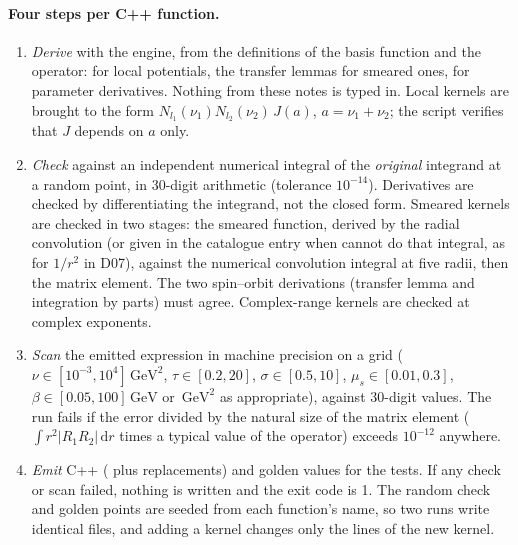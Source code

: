 \documentclass[11pt,a4paper]{article}
\numberwithin{equation}{section}
\theoremstyle{definition}
\theoremstyle{plain}
\theoremstyle{remark}
\numberwithin{algorithm}{section}
\newcommand{\dd}{\mathrm{d}}
\newcommand{\mus}{\mu_s}
\newcommand{\GeV}{\,\mathrm{GeV}}
\begin{document}
\paragraph{Four steps per C++ function.}
\begin{enumerate}[leftmargin=1.5em,itemsep=2pt]
\item \emph{Derive} with the engine, from the definitions of the basis function and the operator:  for local potentials, the transfer lemmas for smeared ones,  for parameter derivatives. Nothing from these notes is typed in. Local kernels are brought to the form $N_{l_1}(\nu_1)N_{l_2}(\nu_2)\,J(a)$, $a=\nu_1+\nu_2$; the script verifies that $J$ depends on $a$ only.
\item \emph{Check} against an independent numerical integral of the \emph{original} integrand at a random point, in 30-digit arithmetic (tolerance $10^{-14}$). Derivatives are checked by differentiating the integrand, not the closed form. Smeared kernels are checked in two stages: the smeared function, derived by the radial convolution (or given in the catalogue entry when  cannot do that integral, as for $1/r^2$ in D07), against the numerical convolution integral at five radii, then the matrix element. The two spin--orbit derivations (transfer lemma and integration by parts) must agree. Complex-range kernels are checked at complex exponents.
\item \emph{Scan} the emitted expression in machine precision on a grid ($\nu\in[10^{-3},10^4]\GeV^2$, $\tau\in[0.2,20]$, $\sigma\in[0.5,10]$, $\mus\in[0.01,0.3]$, $\beta\in[0.05,100]\GeV$ or $\GeV^2$ as appropriate), against 30-digit values. The run fails if the error divided by the natural size of the matrix element ($\int r^2|R_1R_2|\,\dd r$ times a typical value of the operator) exceeds $10^{-12}$ anywhere.
\item \emph{Emit} C++ ( plus replacements) and golden values for the tests. If any check or scan failed, nothing is written and the exit code is 1. The random check and golden points are seeded from each function's name, so two runs write identical files, and adding a kernel changes only the lines of the new kernel.
\end{enumerate}
\end{document}
